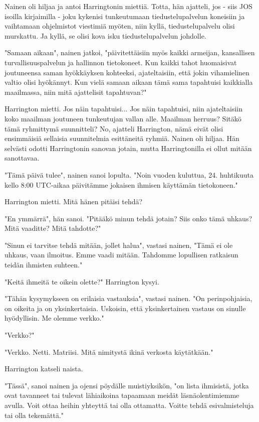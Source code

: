 Nainen oli hiljaa ja antoi Harringtonin miettiä. Totta, hän ajatteli, jos - siis JOS isoilla kirjaimilla - joku kykenisi tunkeutumaan tiedustelupalvelun koneisiin ja vaihtamaan ohjelmistot viestimiä myöten, niin kyllä, tiedustelupalvelu olisi murskattu. Ja kyllä, se olisi kova isku tiedustelupalvelun johdolle.


"Samaan aikaan", nainen jatkoi, "päivitettäisiin myös kaikki armeijan, kansallisen turvallisuuspalvelun ja hallinnon tietokoneet. Kun kaikki tahot huomaisivat joutuneensa saman hyökkäyksen kohteeksi, ajateltaisiin, että jokin vihamielinen valtio olisi hyökännyt. Kun vielä samaan aikaan tämä sama tapahtuisi kaikkialla maailmassa, niin mitä ajattelisit tapahtuvan?"


Harrington mietti. Jos näin tapahtuisi... Jos näin tapahtuisi, niin ajateltaisiin koko maailman joutuneen tunkeutujan vallan alle. Maailman herruus? Sitäkö tämä ryhmittymä suunnitteli? No, ajatteli Harrington, nämä eivät olisi ensimmäisiä sellaisia suunnitelmia esittäneitä ryhmiä. Nainen oli hiljaa. Hän selvästi odotti Harringtonin sanovan jotain, mutta Harringtonilla ei ollut mitään sanottavaa.


"Tämä päivä tulee", nainen sanoi lopulta. "Noin vuoden kuluttua, 24. huhtikuuta kello 8:00 UTC-aikaa päivitämme jokaisen ihmisen käyttämän tietokoneen."


Harrington mietti. Mitä hänen pitäisi tehdä?


"En ymmärrä", hän sanoi. "Pitääkö minun tehdä jotain? Siis onko tämä uhkaus? Mitä vaaditte? Mitä tahdotte?"


"Sinun ei tarvitse tehdä mitään, jollet halua", vastasi nainen, "Tämä ei ole uhkaus, vaan ilmoitus. Emme vaadi mitään. Tahdomme lopullisen ratkaisun teidän ihmisten suhteen."


"Keitä ihmeitä te oikein olette?" Harrington kysyi.


"Tähän kysymykseen on erilaisia vastauksia", vastasi nainen. "On perinpohjaisia, on oikeita ja on yksinkertaisia. Uskoisin, että yksinkertainen vastaus on sinulle hyödyllisin. Me olemme verkko."


"Verkko?"


"Verkko. Netti. Matriisi. Mitä nimitystä ikinä verkosta käytätkään."


Harrington katseli naista.


"Tässä", sanoi nainen ja ojensi pöydälle muistiyksikön, "on lista ihmisistä, jotka ovat tavanneet tai tulevat lähiaikoina tapaamaan meidät läsnäolentimiemme avulla. Voit ottaa heihin yhteyttä tai olla ottamatta. Voitte tehdä esivalmisteluja tai olla tekemättä."



